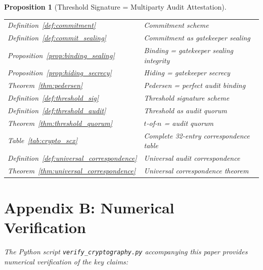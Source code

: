 \documentclass[12pt,a4paper]{article}
\newtheorem{proposition}[theorem]{Proposition}
\theoremstyle{remark}
\begin{document}
\begin{proposition}[Threshold Signature = Multiparty Audit Attestation]
\begin{table}[H]
\begin{tabular}{@{}ll@{}}
\midrule
Definition~\ref{def:commitment} & Commitment scheme \\
Definition~\ref{def:commit_sealing} & Commitment as gatekeeper sealing \\
Proposition~\ref{prop:binding_sealing} & Binding = gatekeeper sealing integrity \\
Proposition~\ref{prop:hiding_secrecy} & Hiding = gatekeeper secrecy \\
Theorem~\ref{thm:pedersen} & Pedersen = perfect audit binding \\
\midrule
Definition~\ref{def:threshold_sig} & Threshold signature scheme \\
Definition~\ref{def:threshold_audit} & Threshold as audit quorum \\
Theorem~\ref{thm:threshold_quorum} & $t$-of-$n$ = audit quorum \\
\midrule
Table~\ref{tab:crypto_scx} & Complete 32-entry correspondence table \\
Definition~\ref{def:universal_correspondence} & Universal audit correspondence \\
Theorem~\ref{thm:universal_correspondence} & Universal correspondence theorem \\
\bottomrule
\end{tabular}
\end{table}


\section*{Appendix B: Numerical Verification}
\label{app:numerical}

The Python script \texttt{verify\_cryptography.py} accompanying this paper provides numerical verification of the key claims:


\end{proposition}
\end{document}
